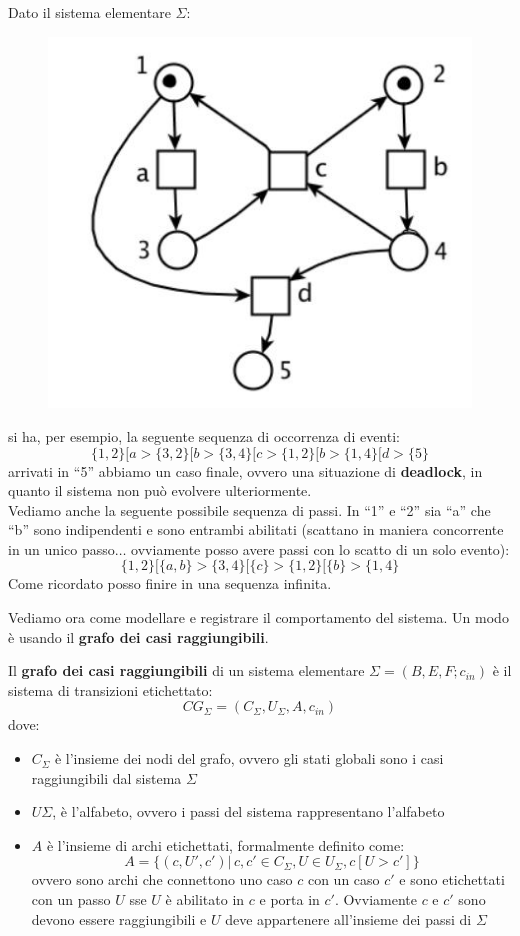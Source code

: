 \documentclass[a4paper,12pt, oneside]{book}
\begin{document}
\begin{esempio}
  Dato il sistema elementare $\Sigma$:
  \begin{figure}[H]
    \centering
    \includegraphics[scale = 0.4]{img/seq.jpg}
  \end{figure}
  si ha, per esempio, la seguente sequenza di occorrenza di eventi:
  \[\{1, 2\}[a > \{3, 2\}[b > \{3, 4\}[c > \{1, 2\}[b > \{1, 4\}[d > \{5\}\]
  arrivati in ``5'' abbiamo un caso finale, ovvero una situazione di
  \textbf{deadlock}, in quanto il sistema non può evolvere ulteriormente.\\
  Vediamo anche la seguente possibile sequenza di passi. In ``1'' e ``2'' sia
  ``a'' che ``b'' sono indipendenti e sono entrambi abilitati (scattano in
  maniera concorrente in un unico passo$\ldots$ ovviamente posso avere passi con lo
  scatto di un solo evento):
  \[\{1, 2\}[\{a, b\} > \{3, 4\}[\{c\} > \{1, 2\}[\{b\} > \{1, 4\}\]
  Come ricordato posso finire in una sequenza infinita.
\end{esempio}
Vediamo ora come modellare e registrare il comportamento del sistema. Un modo è
usando il \textbf{grafo dei casi raggiungibili}.
\begin{definizione}
  Il \textbf{grafo dei casi raggiungibili} di un sistema elementare
  $\Sigma=(B,E,F;c_{in})$ è il sistema di transizioni etichettato:
  \[CG_\Sigma=(C_\Sigma, U_\Sigma, A, c_{in})\]
  dove:
  \begin{itemize}
    \item $C_\Sigma$ è l'insieme dei nodi del grafo, ovvero gli stati globali
    sono i casi raggiungibili dal sistema $\Sigma$    
    \item $U\Sigma$, è l'alfabeto, ovvero i passi del sistema rappresentano
    l'alfabeto 
    \item $A$ è l'insieme di archi etichettati, formalmente definito come:
    \[A=\{(c,U',c')|\,c,c'\in C_\Sigma, U\in U_\Sigma, c[U>c']\}\]
    ovvero sono archi che connettono uno caso $c$ con un caso $c'$ e sono
    etichettati con un passo $U$ sse $U$ è abilitato in $c$ e porta in
    $c'$. Ovviamente $c$ e $c'$ sono devono essere raggiungibili e $U$ deve
    appartenere all'insieme dei passi di $\Sigma$
  \end{itemize} 
\end{definizione}
\end{document}
